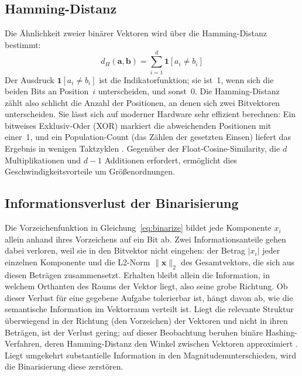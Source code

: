 \subsection{Hamming-Distanz}
%
Die Ähnlichkeit zweier binärer Vektoren wird über die Hamming-Distanz \cite{hamming_1950_codes} bestimmt:
\begin{equation}
  d_H(\mathbf{a}, \mathbf{b}) = \sum_{i=1}^{d} \mathbf{1}[a_i \neq b_i]
\end{equation}
%
Der Ausdruck $\mathbf{1}[a_i \neq b_i]$ ist die Indikatorfunktion; sie ist~1, wenn sich die beiden Bits an Position~$i$ unterscheiden, und sonst~0.
Die Hamming-Distanz zählt also schlicht die Anzahl der Positionen, an denen sich zwei Bitvektoren unterscheiden.
Sie lässt sich auf moderner Hardware sehr effizient berechnen: Ein bitweises Exklusiv-Oder (XOR) markiert die abweichenden Positionen mit einer~1, und ein Population-Count (das Zählen der gesetzten Einsen) liefert das Ergebnis in wenigen Taktzyklen \cite{norouzi_2012_hamming}.
Gegenüber der Float-Cosine-Similarity, die $d$ Multiplikationen und $d-1$ Additionen erfordert, ermöglicht dies Geschwindigkeitsvorteile um Größenordnungen.
%
\subsection{Informationsverlust der Binarisierung}
%
Die Vorzeichenfunktion in Gleichung~\ref{eq:binarize} bildet jede Komponente $x_i$ allein anhand ihres Vorzeichens auf ein Bit ab.
Zwei Informationsanteile gehen dabei verloren, weil sie in den Bitvektor nicht eingehen: der Betrag $|x_i|$ jeder einzelnen Komponente und die L2-Norm $\|\mathbf{x}\|_2$ des Gesamtvektors, die sich aus diesen Beträgen zusammensetzt.
Erhalten bleibt allein die Information, in welchem Orthanten des Raums der Vektor liegt, also seine grobe Richtung.
Ob dieser Verlust für eine gegebene Aufgabe tolerierbar ist, hängt davon ab, wie die semantische Information im Vektorraum verteilt ist.
Liegt die relevante Struktur überwiegend in der Richtung (den Vorzeichen) der Vektoren und nicht in ihren Beträgen, ist der Verlust gering; auf dieser Beobachtung beruhen binäre Hashing-Verfahren, deren Hamming-Distanz den Winkel zwischen Vektoren approximiert \cite{charikar_2002_simhash,gong_2013_itq}.
Liegt umgekehrt substantielle Information in den Magnitudenunterschieden, wird die Binarisierung diese zerstören.
%
%
